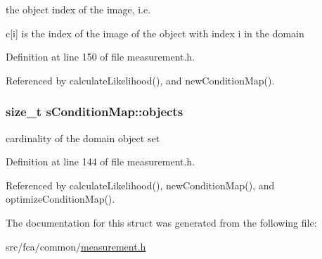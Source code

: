 the object index of the image, i.\-e. 

c\mbox{[}i\mbox{]} is the index of the image of the object with index i in the domain 

\-Definition at line 150 of file measurement.\-h.



\-Referenced by calculate\-Likelihood(), and new\-Condition\-Map().

\hypertarget{structsConditionMap_aba0e3734a3c3c6de4f39d9a6c72f3cca}{
\subsubsection[{objects}]{\setlength{\rightskip}{0pt plus 5cm}size\-\_\-t {\bf s\-Condition\-Map\-::objects}}}\label{structsConditionMap_aba0e3734a3c3c6de4f39d9a6c72f3cca}


cardinality of the domain object set 



\-Definition at line 144 of file measurement.\-h.



\-Referenced by calculate\-Likelihood(), new\-Condition\-Map(), and optimize\-Condition\-Map().



\-The documentation for this struct was generated from the following file\-:\begin{DoxyCompactItemize}
\item 
src/fca/common/\hyperlink{common_2measurement_8h}{measurement.\-h}\end{DoxyCompactItemize}
